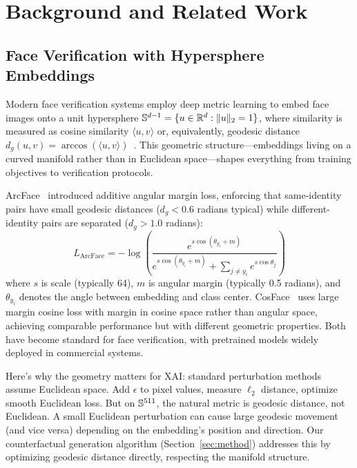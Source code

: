 \section{Background and Related Work}
\label{sec:related}

\subsection{Face Verification with Hypersphere Embeddings}

Modern face verification systems employ deep metric learning to embed face images onto a unit hypersphere $\mathbb{S}^{d-1} = \{u \in \mathbb{R}^d : \|u\|_2 = 1\}$, where similarity is measured as cosine similarity $\langle u, v \rangle$ or, equivalently, geodesic distance $d_g(u,v) = \arccos(\langle u, v \rangle)$~\citep{schroff2015facenet}. This geometric structure—embeddings living on a curved manifold rather than in Euclidean space—shapes everything from training objectives to verification protocols.

ArcFace~\citep{deng2019arcface} introduced additive angular margin loss, enforcing that same-identity pairs have small geodesic distances ($d_g < 0.6$ radians typical) while different-identity pairs are separated ($d_g > 1.0$ radians):
\begin{equation}
L_{\text{ArcFace}} = -\log\left(\frac{e^{s \cos(\theta_{y_i} + m)}}{e^{s \cos(\theta_{y_i} + m)} + \sum_{j \neq y_i} e^{s \cos \theta_j}}\right)
\end{equation}
where $s$ is scale (typically 64), $m$ is angular margin (typically 0.5 radians), and $\theta_{y_i}$ denotes the angle between embedding and class center. CosFace~\citep{wang2018cosface} uses large margin cosine loss with margin in cosine space rather than angular space, achieving comparable performance but with different geometric properties. Both have become standard for face verification, with pretrained models widely deployed in commercial systems.

Here's why the geometry matters for XAI: standard perturbation methods assume Euclidean space. Add $\epsilon$ to pixel values, measure $\ell_2$ distance, optimize smooth Euclidean loss. But on $\mathbb{S}^{511}$, the natural metric is geodesic distance, not Euclidean. A small Euclidean perturbation can cause large geodesic movement (and vice versa) depending on the embedding's position and direction. Our counterfactual generation algorithm (Section~\ref{sec:method}) addresses this by optimizing geodesic distance directly, respecting the manifold structure.

